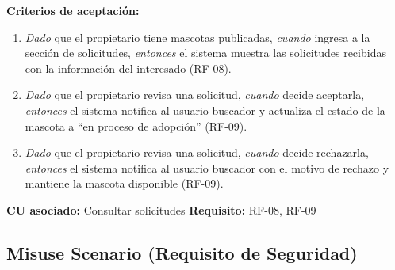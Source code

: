 \documentclass[journal,onecolumn]{IEEEtran}
\begin{document}
\textbf{Criterios de aceptación:}
\begin{enumerate}[leftmargin=*]
  \item \textit{Dado} que el propietario tiene mascotas publicadas,
  \textit{cuando} ingresa a la sección de solicitudes, \textit{entonces} el
  sistema muestra las solicitudes recibidas con la información del
  interesado (RF-08).
  \item \textit{Dado} que el propietario revisa una solicitud, \textit{cuando}
  decide aceptarla, \textit{entonces} el sistema notifica al usuario
  buscador y actualiza el estado de la mascota a ``en proceso de adopción''
  (RF-09).
  \item \textit{Dado} que el propietario revisa una solicitud, \textit{cuando}
  decide rechazarla, \textit{entonces} el sistema notifica al usuario
  buscador con el motivo de rechazo y mantiene la mascota disponible
  (RF-09).
\end{enumerate}
\textbf{CU asociado:} Consultar solicitudes \quad \textbf{Requisito:} RF-08, RF-09

\subsection{Misuse Scenario (Requisito de Seguridad)}
\end{document}
